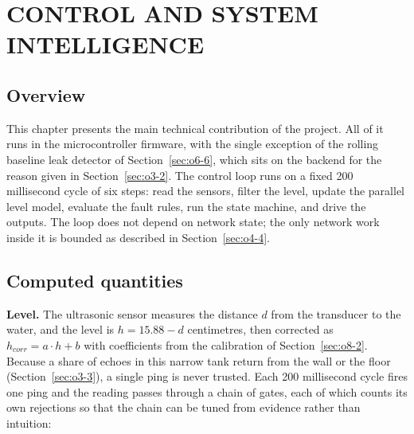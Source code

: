 \chapter{CONTROL AND SYSTEM INTELLIGENCE}
\label{chap:control}

\section{Overview}
\label{sec:o6-1}

This chapter presents the main technical contribution of the project. All of it runs in the microcontroller firmware, with the single exception of the rolling baseline leak detector of Section~\ref{sec:o6-6}, which sits on the backend for the reason given in Section~\ref{sec:o3-2}. The control loop runs on a fixed 200 millisecond cycle of six steps: read the sensors, filter the level, update the parallel level model, evaluate the fault rules, run the state machine, and drive the outputs. The loop does not depend on network state; the only network work inside it is bounded as described in Section~\ref{sec:o4-4}.

\section{Computed quantities}
\label{sec:o6-2}

\textbf{Level.} The ultrasonic sensor measures the distance $d$ from the transducer to the water, and the level is $h = 15.88 - d$ centimetres, then corrected as $h_{corr} = a \cdot h + b$ with coefficients from the calibration of Section~\ref{sec:o8-2}. Because a share of echoes in this narrow tank return from the wall or the floor (Section~\ref{sec:o3-3}), a single ping is never trusted. Each 200 millisecond cycle fires one ping and the reading passes through a chain of gates, each of which counts its own rejections so that the chain can be tuned from evidence rather than intuition:

